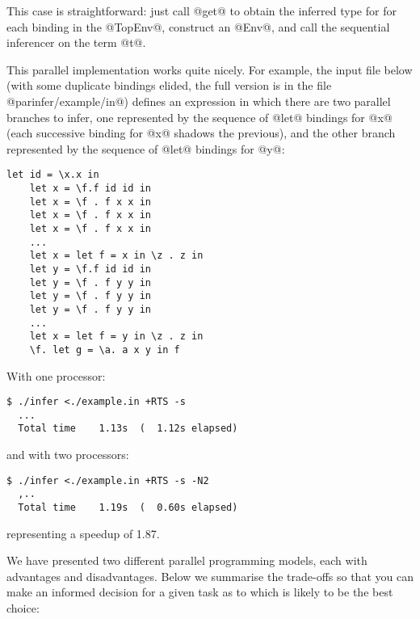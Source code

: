 \noindent This case is straightforward: just call @get@ to obtain the
inferred type for for each binding in the @TopEnv@, construct an
@Env@, and call the sequential inferencer on the term @t@.

This parallel implementation works quite nicely.  For example, the
input file below (with some duplicate bindings elided, the full
version is in the file @parinfer/example/in@) defines an expression in
which there are two parallel branches to infer, one represented by
the sequence of @let@ bindings for @x@ (each successive binding for
@x@ shadows the previous), and the other branch represented by the
sequence of @let@ bindings for @y@:

{\small \begin{verbatim}
let id = \x.x in
    let x = \f.f id id in
    let x = \f . f x x in
    let x = \f . f x x in
    let x = \f . f x x in
    ...
    let x = let f = x in \z . z in
    let y = \f.f id id in
    let y = \f . f y y in
    let y = \f . f y y in
    let y = \f . f y y in
    ...
    let x = let f = y in \z . z in
    \f. let g = \a. a x y in f
\end{verbatim}}

\noindent With one processor:

{\small \begin{verbatim}
$ ./infer <./example.in +RTS -s
  ...
  Total time    1.13s  (  1.12s elapsed)
\end{verbatim}}

\noindent and with two processors:

{\small \begin{verbatim}
$ ./infer <./example.in +RTS -s -N2
  ,..
  Total time    1.19s  (  0.60s elapsed)
\end{verbatim}}

\noindent representing a speedup of 1.87.


We have presented two different parallel programming models, each with
advantages and disadvantages.  Below we summarise the trade-offs so
that you can make an informed decision for a given task as to which is
likely to be the best choice:

